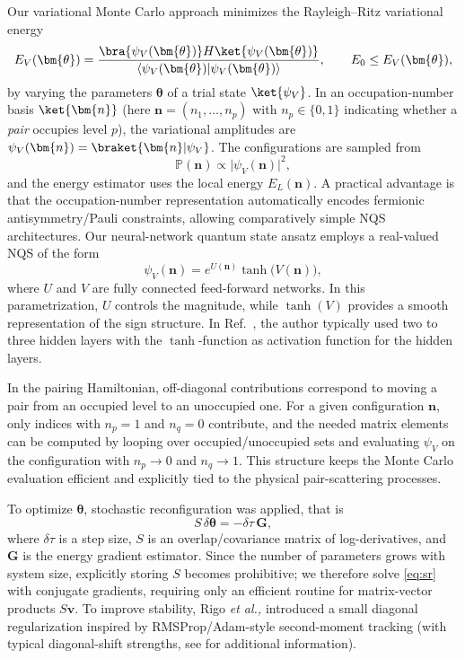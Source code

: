 Our variational Monte Carlo approach minimizes the Rayleigh--Ritz variational energy
\begin{equation}
E_V(\bm{\theta})=\frac{\bra{\psi_V(\bm{\theta})}H\ket{\psi_V(\bm{\theta})}}{\langle\psi_V(\bm{\theta})\vert\psi_V(\bm{\theta})\rangle},
\qquad E_0\le E_V(\bm{\theta}),
\label{eq:Ev}
\end{equation}
by varying the parameters $\bm{\theta}$ of a trial state $\ket{\psi_V}$.
In an occupation-number basis $\ket{\bm{n}}$ (here $\bm{n}=(n_1,\dots,n_p)$ with $n_p\in\{0,1\}$ indicating whether
a \emph{pair} occupies level $p$), the variational amplitudes are $\psi_V(\bm{n})=\braket{\bm{n}|\psi_V}$.
The configurations are sampled from
\begin{equation}
\mathbb{P}(\bm{n})\propto \vert\psi_V(\bm{n})\vert^2,
\label{eq:prob}
\end{equation}
and the energy estimator uses the local energy $E_L(\bm{n})$.
A practical advantage is that the occupation-number representation automatically encodes
fermionic antisymmetry/Pauli constraints, allowing comparatively simple NQS architectures. 
Our neural-network quantum state ansatz employs a real-valued NQS of the form
\begin{equation}
\psi_V(\bm{n})=e^{U(\bm{n})}\tanh\!\big(V(\bm{n})\big),
\label{eq:nqs}
\end{equation}
where $U$ and $V$ are fully connected feed-forward networks. In this parametrization, $U$ controls the magnitude,
while $\tanh(V)$ provides a smooth representation of the sign structure. In Ref.~\cite{rigo2023}, the author typically used two to three  hidden layers with
the $\tanh$-function as  activation function for the hidden layers. 

In the pairing Hamiltonian, off-diagonal contributions correspond to
moving a pair from an occupied level to an unoccupied one. For a given
configuration $\bm{n}$, only indices with $n_p=1$ and $n_q=0$
contribute, and the needed matrix elements can be computed by looping
over occupied/unoccupied sets and evaluating $\psi_V$ on the
configuration with $n_p\!\to 0$ and $n_q\!\to 1$. This structure keeps
the Monte Carlo evaluation efficient and explicitly tied to the
physical pair-scattering processes.

To optimize $\bm{\theta}$, stochastic reconfiguration  \cite{Sorella:2005} was applied, that is
\begin{equation}
S\,\delta\bm{\theta}=-\delta\tau\,\bm{G},
\label{eq:sr}
\end{equation}
where $\delta\tau$ is a step size, $S$ is an overlap/covariance matrix
of log-derivatives, and $\bm{G}$ is the energy gradient
estimator. Since the number of parameters grows with system size,
explicitly storing $S$ becomes prohibitive; we therefore solve
\eqref{eq:sr} with conjugate gradients, requiring only an efficient
routine for matrix-vector products $S\bm{v}$. To improve stability,
Rigo {\em et al.,} \cite{rigo2023} introduced a small diagonal
regularization inspired by RMSProp/Adam-style second-moment tracking
(with typical diagonal-shift strengths, see \cite{rigo2023} for additional information).

